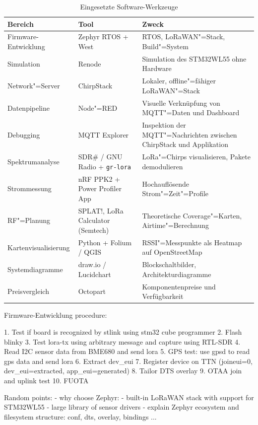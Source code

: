 \begin{table}[htbp]
    \centering
    \caption{Eingesetzte Software-Werkzeuge}
    \label{tab:tools}
    \begin{tabularx}{\textwidth}{l l X}
        \toprule
        \textbf{Bereich} & \textbf{Tool} & \textbf{Zweck} \\
        \midrule
        Firmware-Entwicklung
            & Zephyr RTOS + West
            & RTOS, LoRaWAN"=Stack, Build"=System \\
        \addlinespace
        Simulation
            & Renode
            & Simulation des STM32WL55 ohne Hardware \\
        \addlinespace
        Network"=Server
            & ChirpStack
            & Lokaler, offline"=fähiger LoRaWAN"=Stack \\
        \addlinespace
        Datenpipeline
            & Node"=RED
            & Visuelle Verknüpfung von MQTT"=Daten und Dashboard \\
        \addlinespace
        Debugging
            & MQTT Explorer
            & Inspektion der MQTT"=Nachrichten zwischen ChirpStack und Applikation \\
        \addlinespace
        Spektrumanalyse
            & SDR\# / GNU Radio + \texttt{gr-lora}
            & LoRa"=Chirps visualisieren, Pakete demodulieren \\
        \addlinespace
        Strommessung
            & nRF PPK2 + Power Profiler App
            & Hochauflösende Strom"=Zeit"=Profile \\
        \addlinespace
        RF"=Planung
            & SPLAT!, LoRa Calculator (Semtech)
            & Theoretische Coverage"=Karten, Airtime"=Berechnung \\
        \addlinespace
        Kartenvisualisierung
            & Python + Folium / QGIS
            & RSSI"=Messpunkte als Heatmap auf OpenStreetMap \\
        \addlinespace
        Systemdiagramme
            & draw.io / Lucidchart
            & Blockschaltbilder, Architekturdiagramme \\
        \addlinespace
        Preisvergleich
            & Octopart
            & Komponentenpreise und Verfügbarkeit \\
        \bottomrule
    \end{tabularx}
\end{table}

Firmware-Entwicklung procedure:

1. Test if board is recognized by stlink using stm32 cube programmer
2. Flash blinky
3. Test lora-tx using arbitrary message and capture using RTL-SDR
4. Read I2C sensor data from BME680 and send lora
5. GPS test: use gpsd to read gps data and send lora
6. Extract dev_eui
7. Register device on TTN (joineui=0, dev_eui=extracted, app_eui=generated)
8. Tailor DTS overlay
9. OTAA join and uplink test
10. FUOTA 

Random points:
- why choose Zephyr: 
    - built-in LoRaWAN stack with support for STM32WL55
    - large library of sensor drivers
- explain Zephyr ecosystem and filesystem structure: conf, dts, overlay, bindings ...





